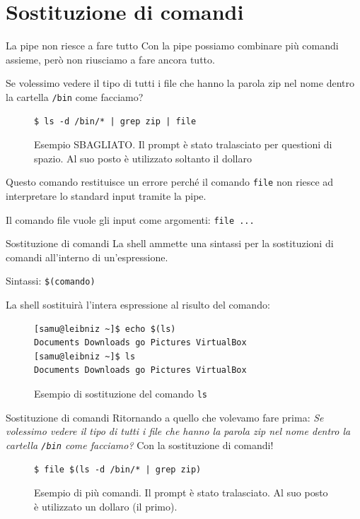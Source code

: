 \documentclass{beamer}
\begin{document}
\section{Sostituzione di comandi}
\begin{frame}[fragile]{La pipe non riesce a fare tutto}
  Con la pipe possiamo combinare più comandi assieme, però non riusciamo a fare
  ancora tutto. \medskip

  Se volessimo vedere il tipo di tutti i file che hanno la parola zip nel nome
  dentro la cartella \texttt{/bin} come facciamo? \medskip \pause

  \begin{figure}
    \begin{lstlisting}
$ ls -d /bin/* | grep zip | file
    \end{lstlisting}
    \caption{Esempio SBAGLIATO. Il prompt è stato tralasciato per questioni di 
    spazio. Al suo posto è utilizzato soltanto il dollaro}
  \end{figure}
  
  Questo comando restituisce un errore perché il comando \texttt{file} non 
  riesce ad interpretare lo standard input tramite la pipe. \pause

  Il comando file vuole gli input come argomenti: \texttt{file ...}
\end{frame}

\begin{frame}[fragile]{Sostituzione di comandi}
  La shell ammette una sintassi per la sostituzioni di comandi all'interno di
  un'espressione. \medskip

  Sintassi: \texttt{\$(comando)} \medskip

  La shell sostituirà l'intera espressione al risulto del comando:
  \begin{figure}
    \begin{lstlisting}
[samu@leibniz ~]$ echo $(ls)
Documents Downloads go Pictures VirtualBox
[samu@leibniz ~]$ ls
Documents Downloads go Pictures VirtualBox
    \end{lstlisting}
    \caption{Esempio di sostituzione del comando \texttt{ls}}
  \end{figure}
\end{frame}

\begin{frame}[fragile]{Sostituzione di comandi}
  Ritornando a quello che volevamo fare prima: \textit{Se volessimo vedere il 
  tipo di tutti i file che hanno la parola zip nel nome dentro la cartella 
  \texttt{/bin} come facciamo?} \pause Con la sostituzione di comandi! \medskip

  \begin{figure}
    \begin{lstlisting}
$ file $(ls -d /bin/* | grep zip)
    \end{lstlisting}
    \caption{Esempio di più comandi. Il prompt è stato tralasciato. Al suo posto
    è utilizzato un dollaro (il primo).}
  \end{figure}
\end{frame}
\end{document}

